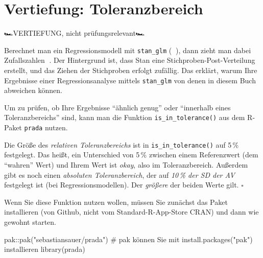 \documentclass[
  ngerman,
  letterpaper,
  twoside,
  open=any]{scrbook}
\newenvironment{Shaded}{\begin{snugshade}}{\end{snugshade}}
\newcommand{\CommentTok}[1]{\textcolor[rgb]{0.37,0.37,0.37}{#1}}
\newcommand{\FunctionTok}[1]{\textcolor[rgb]{0.28,0.35,0.67}{#1}}
\newcommand{\NormalTok}[1]{\textcolor[rgb]{0.00,0.23,0.31}{#1}}
\newcommand{\SpecialCharTok}[1]{\textcolor[rgb]{0.37,0.37,0.37}{#1}}
\newcommand{\StringTok}[1]{\textcolor[rgb]{0.13,0.47,0.30}{#1}}
\theoremstyle{definition}
\theoremstyle{plain}
\theoremstyle{definition}
\theoremstyle{definition}
\theoremstyle{definition}
\theoremstyle{definition}
\theoremstyle{remark}
\begin{document}
\section{Vertiefung: Toleranzbereich}\label{sec-toleranz}

🏎️VERTIEFUNG, nicht prüfungsrelevant🏎️

Berechnet man ein Regressionsmodell mit \texttt{stan\_glm} (🤖😁), dann
zieht man dabei Zufallszahlen 🎲. Der Hintergrund ist, dass Stan eine
Stichproben-Post-Verteilung erstellt, und das Ziehen der Stichproben
erfolgt zufällig. Das erklärt, warum Ihre Ergebnisse einer
Regressionsanalyse mittels \texttt{stan\_glm} von denen in diesem Buch
abweichen können.

Um zu prüfen, ob Ihre Ergebnisse \enquote{ähnlich genug} oder
\enquote{innerhalb eines Toleranzbereichs} sind, kann man die Funktion
\texttt{is\_in\_tolerance()} aus dem R-Paket \texttt{prada} nutzen.

\begin{tcolorbox}[enhanced jigsaw, arc=.35mm, bottomrule=.15mm, bottomtitle=1mm, breakable, colback=white, colbacktitle=quarto-callout-note-color!10!white, colframe=quarto-callout-note-color-frame, coltitle=black, left=2mm, leftrule=.75mm, opacityback=0, opacitybacktitle=0.6, rightrule=.15mm, title=\textcolor{quarto-callout-note-color}{\faInfo}\hspace{0.5em}{Größe des Toleranzbereichs}, titlerule=0mm, toprule=.15mm, toptitle=1mm]

Die Größe des \emph{relativen Toleranzbereichs} ist in
\texttt{is\_in\_tolerance()} auf 5\,\% festgelegt. Das heißt, ein
Unterschied von 5\,\% zwischen einem Referenzwert (dem \enquote{wahren}
Wert) und Ihrem Wert ist \emph{okay}, also im Toleranzbereich. Außerdem
gibt es noch einen \emph{absoluten Toleranzbereich}, der auf
\emph{10\,\% der SD der AV} festgelegt ist (bei Regressionsmodellen).
Der \emph{größere} der beiden Werte gilt. \(\square\)

\end{tcolorbox}

Wenn Sie diese Funktion nutzen wollen, müssen Sie zunächst das Paket
installieren (von Github, nicht vom Standard-R-App-Store CRAN) und dann
wie gewohnt starten.

\begin{Shaded}
\begin{Highlighting}[]
\NormalTok{pak}\SpecialCharTok{::}\FunctionTok{pak}\NormalTok{(}\StringTok{"sebastiansauer/prada"}\NormalTok{)  }\CommentTok{\# \textasciigrave{}pak\textasciigrave{} können Sie mit \textasciigrave{}install.packages("pak")\textasciigrave{} installieren}
\FunctionTok{library}\NormalTok{(prada)}
\end{Highlighting}
\end{Shaded}
\end{document}
